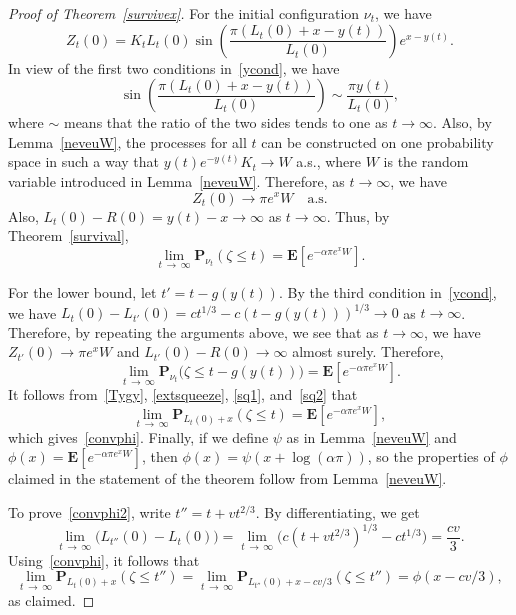 \documentclass[10pt]{amsart}
\theoremstyle{definition}\newtheorem{defi}[theo]{Definition}\newtheorem{rema}[theo]{Remark}\newtheorem{exam}[theo]{Example}\newtheorem{exem}[theo]{Example}\newtheorem{nota}[theo]{Notation}
\newcommand*\E{\mathbf{E}}
\renewcommand*\P{\mathbf{P}}
\newcommand{\1} {\mathds{1}}
\begin{document}
\begin{proof}[Proof of Theorem~\ref{survivex}]
For the initial configuration $\nu_t$, we have
\[
Z_t(0) = K_t L_t(0) \sin \left(\frac{\pi \left(L_t(0) + x - y(t)\right)}{L_t(0)} \right) e^{x - y(t)}.
\]
In view of the first two conditions in~\eqref{ycond}, we have
\[
\sin \left(\frac{\pi \left(L_t(0) + x - y(t)\right)}{L_t(0)} \right) \sim \frac{\pi y(t)}{L_t(0)},
\]
where $\sim$ means that the ratio of the two sides tends to one as $t \rightarrow \infty$. Also, by Lemma~\ref{neveuW}, the processes for all $t$ can be constructed on one probability space in such a way that
$y(t) e^{-y(t)} K_t \rightarrow W$ a.s., where $W$ is the random variable introduced in Lemma~\ref{neveuW}. Therefore, as $t \rightarrow \infty$, we have
\[
Z_t(0) \rightarrow \pi e^x W \quad\text{a.s.}
\]
Also, $L_t(0) - R(0) = y(t) - x \rightarrow \infty$ as $t \rightarrow \infty$.
Thus, by Theorem~\ref{survival},
\begin{equation}\label{sq1}
\lim_{t\,\rightarrow\,\infty} \P_{\nu_t}(\zeta \leq t) = \E\left[e^{-\alpha \pi e^x W}\right].
\end{equation}

For the lower bound, let $t' = t - g(y(t))$. By the third condition in~\eqref{ycond}, we have $L_t(0) - L_{t'}(0) = c t^{1/3} - c (t - g(y(t)))^{1/3} \rightarrow 0$ as $t \rightarrow \infty$. Therefore, by repeating the arguments above, we see that as $t \rightarrow \infty$, we have $Z_{t'}(0) \rightarrow \pi e^x W$ and $L_{t'}(0) - R(0) \rightarrow \infty$ almost surely. Therefore,
\begin{equation}\label{sq2}
\lim_{t\,\rightarrow\,\infty} \P_{\nu_t}\big(\zeta \leq t - g(y(t))\big) = \E\left[e^{-\alpha \pi e^x W}\right].
\end{equation}
It follows from~\eqref{Tygy}, \eqref{extsqueeze}, \eqref{sq1}, and~\eqref{sq2} that
\[
\lim_{t\,\rightarrow\,\infty} \P_{L_t(0) + x}(\zeta \leq t) = \E\left[e^{-\alpha \pi e^x W}\right],
\]
which gives~\eqref{convphi}. Finally, if we define $\psi$ as in Lemma~\ref{neveuW} and $\phi(x) = \E[e^{-\alpha \pi e^x W}]$, then $\phi(x) = \psi(x + \log(\alpha \pi))$, so the properties of $\phi$ claimed in the statement of the theorem follow from Lemma~\ref{neveuW}.

To prove~\eqref{convphi2}, write $t'' = t + v t^{2/3}$. By differentiating, we get
\begin{equation}\label{tpt}
\lim_{t\,\rightarrow\,\infty} \big(L_{t''}(0) - L_t(0) \big) = \lim_{t\,\rightarrow\,\infty} \big(c\left(t + v t^{2/3}\right)^{1/3} - c t^{1/3} \big) = \frac{cv}{3}.
\end{equation}
Using~\eqref{convphi}, it follows that
\[
\lim_{t\,\rightarrow\,\infty} \P_{L_t(0) + x}\left(\zeta \leq t''\right) = \lim_{t\,\rightarrow\,\infty} \P_{L_{t''}(0) + x - cv/3}\left(\zeta \leq t''\right) = \phi(x - cv/3),
\]
as claimed.
\end{proof}
\end{document}
